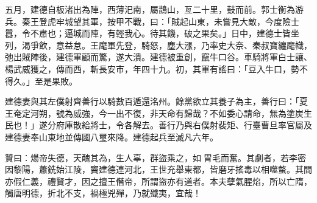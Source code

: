 \begin{pinyinscope}
 五月，建德自板渚出為陣，西薄汜南，屬鵲山，亙二十里，鼓而前。郭士衡為游兵。秦王登虎牢城望其軍，按甲不戰，曰：「賊起山東，未嘗見大敵，今度險士囂，令不肅也；逼城而陣，有輕我心。待其饑，破之果矣。」日中，建德士皆坐列，渴爭飲，意益怠。王麾軍先登，騎怒，塵大漲，乃率史大奈、秦叔寶纏麾幟，弛出賊陣後，建德軍顧而驚，遂大潰。建德被重創，竄牛口谷。車騎將軍白士讓、楊武威獲之，傳而西，斬長安市，年四十九。初，其軍有謠曰：「豆入牛口，勢不得久。」至是果敗。



 建德妻與其左僕射齊善行以騎數百遁還洺州。餘黨欲立其養子為主，善行曰：「夏王奄定河朔，號為威強，今一出不復，非天命有歸哉？不如委心請命，無為塗炭生民也！」遂分府庫散給將士，令各解去。善行乃與右僕射裴矩、行臺曹旦率官屬及建德妻奉山東地並傳國八璽來降。建德起兵至滅凡六年。



 贊曰：煬帝失德，天醜其為，生人辜，群盜乘之，如胃毛而奮。其劇者，若李密因黎陽，蕭銑始江陵，竇建德連河北，王世充舉東都，皆磨牙搖毒以相噬螫。其間亦假仁義，禮賢才，因之擅王僭帝，所謂盜亦有道者。本夫孽氣腥焰，所以亡隋，觸唐明德，折北不支，禍極兇殫，乃就殲夷，宜哉！



\end{pinyinscope}